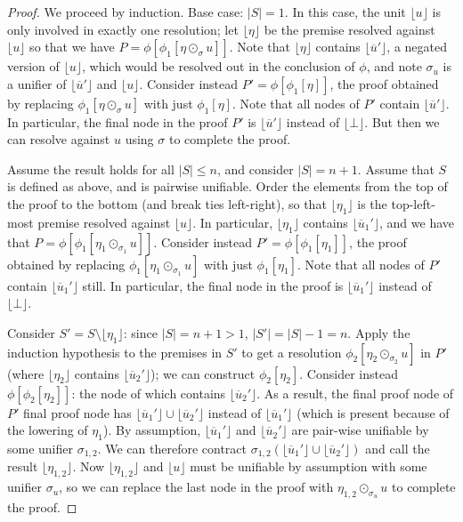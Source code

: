 \documentclass[12pt]{article}
\theoremstyle{definition}
\theoremstyle{remark}
\newcommand{\clause}[1]{ \lfloor{#1} \rfloor}
\begin{document}
\begin{proof}
We proceed by induction. Base case: $|S|=1$. In this case, the unit $\clause{u}$ is only involved in exactly one resolution; let $\clause{\eta}$ be the premise resolved against $\clause{u}$ so that we have $P=\phi[\phi_1[\eta \odot_{\sigma} u]]$. Note that $\clause{\eta}$ contains $\clause{\overline{u}'}$, a negated version of $\clause{u}$, which would be resolved out in the conclusion of $\phi$, and note $\sigma_u$ is a unifier of $\clause{\overline{u}'}$ and $\clause{u}$. Consider instead $P'=\phi[\phi_1[\eta]]$, the proof obtained by replacing $\phi_1[\eta \odot_{\sigma} u]$ with just $\phi_1[\eta]$. Note that all nodes of $P'$ contain $\clause{\overline{u}'}$. In particular, the final node in the proof $P'$ is $\clause{\overline{u}'}$ instead of $\clause{\bot}$. But then we can resolve against $u$ using $\sigma$ to complete the proof.

Assume the result holds for all $|S|\le n$, and consider $|S|=n+1$. Assume that $S$ is defined as above, and is pairwise unifiable. Order the elements from the top of the proof to the bottom (and break ties left-right), so that $\clause{\eta_1}$ is the top-left-most premise resolved against $\clause{u}$. In particular, $\clause{\eta_1}$ contains $\clause{\overline{u}_1'}$, and we have that $P=\phi[\phi_1[\eta_1 \odot_{\sigma_1} u]]$. Consider instead $P'=\phi[\phi_{1}[\eta_1]]$, the proof obtained by replacing $\phi_1[\eta_1 \odot_{\sigma_1} u]$ with just $\phi_{1}[\eta_1]$. Note that all nodes of $P'$ contain $\clause{\overline{u}_1'}$ still. In particular, the final node in the proof is $\clause{\overline{u}_1'}$ instead of $\clause{\bot}$.  

Consider $S'=S\setminus\clause{\eta_1}$: since $|S|=n+1>1$, $|S'| = |S|-1 = n$. Apply the induction hypothesis to the premises in $S'$ to get a  resolution $\phi_2[\eta_2 \odot_{\sigma_2} u]$ in $P'$ (where $\clause{\eta_2}$ contains $\clause{\overline{u}_2'}$);  we can construct $\phi_{2}[\eta_2]$. Consider instead  $\phi[\phi_{2}[\eta_2]]$: the  node of which contains $\clause{\overline{u}_2'}$. As a result, the final proof node of $P'$ final proof node has $\clause{\overline{u}_1'} \cup \clause{\overline{u}_2'}$ instead of $\clause{\overline{u}_1'}$ (which is present because of the lowering of $\eta_1$). By assumption, $\clause{\overline{u}_1'}$ and $\clause{\overline{u}_2'}$ are pair-wise unifiable by some unifier $\sigma_{1,2}$. We can therefore contract $\sigma_{1,2}(\clause{\overline{u}_1'} \cup \clause{\overline{u}_2'})$ and call the result $\clause{\eta_{1,2}}$. Now $\clause{\eta_{1,2}}$ and $\clause{u}$ must be unifiable by assumption with some unifier $\sigma_u$, so we can replace the last node in the proof with $\eta_{1,2}\odot_{\sigma_u} u$ to complete the proof.
\end{proof}
\end{document}

